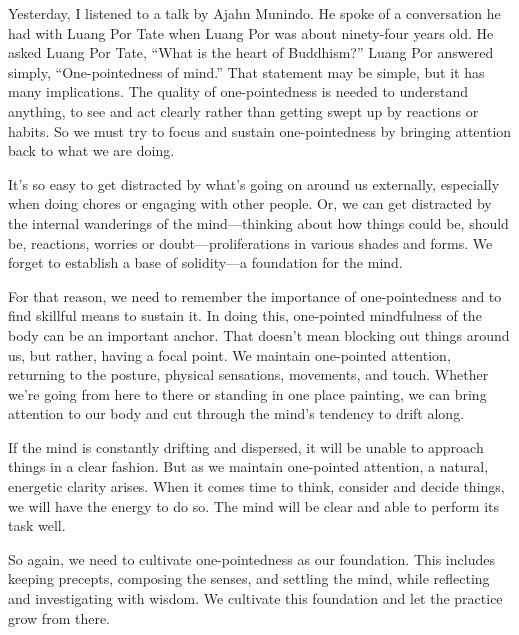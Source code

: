 
Yesterday, I listened to a talk by Ajahn Munindo. He spoke of a 
conversation he had with Luang Por Tate when Luang Por was about 
ninety-four years old. He asked Luang Por Tate, ``What is the heart of 
Buddhism?'' Luang Por answered simply, ``One-pointedness of mind.'' 
That statement may be simple, but it has many implications. The quality 
of one-pointedness is needed to understand anything, to see and act 
clearly rather than getting swept up by reactions or habits. So we must 
try to focus and sustain one-pointedness by bringing attention back to 
what we are doing.

It's so easy to get distracted by what's going on around us externally, 
especially when doing chores or engaging with other people. Or, we can 
get distracted by the internal wanderings of the mind---thinking about 
how things could be, should be, reactions, worries or 
doubt---proliferations in various shades and forms. We forget to 
establish a base of solidity---a foundation for the mind.

For that reason, we need to remember the importance of one-pointedness 
and to find skillful means to sustain it. In doing this, one-pointed 
mindfulness of the body can be an important anchor. That doesn't mean 
blocking out things around us, but rather, having a focal point. We 
maintain one-pointed attention, returning to the posture, physical 
sensations, movements, and touch. Whether we're going from here to 
there or standing in one place painting, we can bring attention to our 
body and cut through the mind's tendency to drift along.

If the mind is constantly drifting and dispersed, it will be unable to 
approach things in a clear fashion. But as we maintain one-pointed 
attention, a natural, energetic clarity arises. When it comes time to 
think, consider and decide things, we will have the energy to do so. 
The mind will be clear and able to perform its task well.

So again, we need to cultivate one-pointedness as our foundation. This 
includes keeping precepts, composing the senses, and settling the mind, 
while reflecting and investigating with wisdom. We cultivate this 
foundation and let the practice grow from there.

